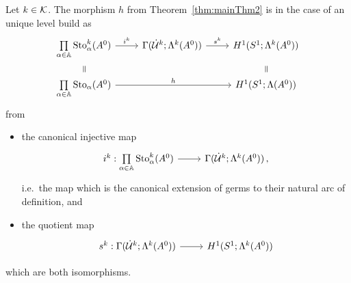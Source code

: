 \begin{lem}
  Let $k\in\mathcal{K}$.
  The morphism $h$ from Theorem~\ref{thm:mainThm2} is in the case of an unique
  level build as
  \[ \begin{tikzcd}[row sep=0cm]
    \underset{\alpha\in\A}\prod\Sto_\alpha^k(A^0)
    \rar{i^k}
    & \Gamma(\dot\cU^k;\Lambda^k(A^0))
    \rar{s^k}
    & H^1(S^1;\Lambda^k(A^0))
    \\
    \text{\rotatebox[origin=c]{-90}{$=$}}
    &&
    \text{\rotatebox[origin=c]{-90}{$=$}}
    \\
    \underset{\alpha\in\A}\prod\Sto_\alpha(A^0)
    \arrow{rr}{h}
    &
    & H^1(S^1;\Lambda(A^0))
  \end{tikzcd} \]
  from
  \begin{itemize}
    \item the canonical injective map
      \[ \begin{tikzcd}
        i^k:\underset{\alpha\in\A}\prod\Sto_\alpha^k(A^0) \rar&
        \Gamma(\dot\cU^k;\Lambda^k(A^0)) \,,
      \end{tikzcd} \]
      i.e.\ the map which is the canonical extension of germs to their natural
      arc of definition, and
    \item the quotient map
      \[ \begin{tikzcd}
        s^k:\Gamma(\dot\cU^k;\Lambda^k(A^0)) \rar& H^1(S^1;\Lambda^k(A^0))
      \end{tikzcd} \]
  \end{itemize}
  which are both isomorphisms.
\end{lem}

